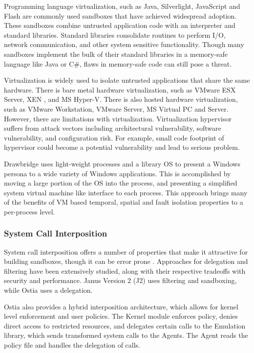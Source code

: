 Programming language virtualization, such as Java, Silverlight, JavaScript and Flash are commonly used sandboxes that 
have achieved widespread adoption. These sandboxes combine untrusted application code with an interpreter and 
standard libraries. Standard libraries consolidate routines to perform I/O, network communication, and other system sensitive 
functionality. Though many sandboxes implement the bulk of their standard libraries in a memory-safe language like 
Java or C\#, flaws in memory-safe code can still pose a threat.

Virtualization is widely used to isolate untrusted applications that share the same hardware. There is bare metal hardware 
virtualization, such as VMware ESX Server, XEN \cite{Xen:03}, and MS Hyper-V. There is also hosted hardware virtualization, 
such as VMware Workstation, VMware Server, MS Virtual PC and Server. However, there are limitations with virtualization. 
Virtualization hypervisor suffers from attack vectors including architectural vulnerability, software vulnerability, 
and configuration risk. For example, small code footprint of hypervisor could become a potential vulnerability 
and lead to serious problem.

Drawbridge \cite{Drawbridge:11} uses light-weight processes and a library OS to present a Windows persona to 
a wide variety of Windows applications. This is accomplished by moving a large portion of the OS into the process, 
and presenting a simplified system virtual machine like interface to each process. This approach brings many of 
the benefits of VM based temporal, spatial and fault isolation properties to a per-process level.


\subsubsection{System Call Interposition}

System call interposition offers a number of properties that make it attractive for building sandboxes, 
though it can be error prone \cite{SCI:04}. Approaches for delegation and filtering have been extensively studied, 
along with their respective tradeoffs with security and performance. Janus Version 2 (J2) \cite{Janus0:96, Janus:99} 
uses filtering and sandboxing, while Ostia \cite{SCI:04} uses a delegation.

Ostia also provides a hybrid interposition architecture, which allows for kernel level enforcement and user policies. 
The Kernel module enforces policy, denies direct access to restricted resources, and delegates certain calls to 
the Emulation library, which sends transformed system calls to the Agents. The Agent reads the policy file and 
handles the delegation of calls.


